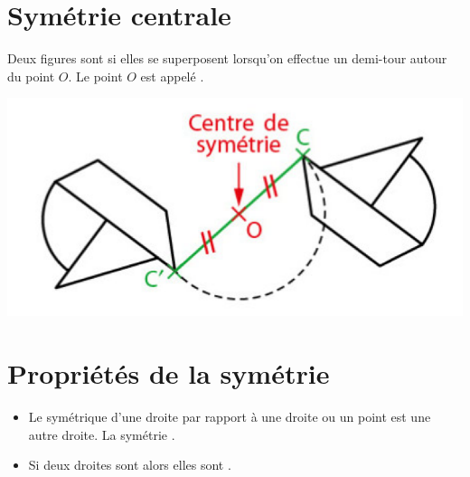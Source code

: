 \documentclass[12pt,a4paper]{article}
\begin{document}
\section{Symétrie centrale}




\begin{mydef}

	Deux figures sont  si elles se superposent lorsqu'on effectue un demi-tour autour du point $O$. Le point $O$ est appelé .
	
\end{mydef}

\begin{myex}
	\begin{center}
		\includegraphics[scale=.75]{fig2}
	\end{center}
\end{myex}


\section{Propriétés de la symétrie}

\begin{myprops}
	\begin{itemize}
		\item Le symétrique d'une droite par rapport à une droite ou un point est une autre droite. La symétrie .
		\item Si deux droites sont  alors elles sont .
	\end{itemize}
\end{myprops}
\end{document}
